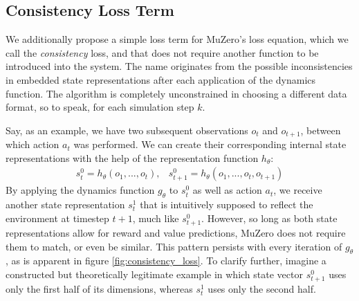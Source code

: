 \subsection{Consistency Loss Term}
We additionally propose a simple loss term for MuZero's loss equation, which we call the \textit{consistency} loss, and that does not require another function to be introduced into the system. The name originates from the possible inconsistencies in embedded state representations after each application of the dynamics function. The algorithm is completely unconstrained in choosing a different data format, so to speak, for each simulation step $k$.

Say, as an example, we have two subsequent observations $o_t$ and $o_{t+1}$, between which action $a_t$ was performed. We can create their corresponding internal state representations with the help of the representation function $h_\theta$:
\begin{equation*}
    \begin{array}{cc}
        s^0_t = h_\theta(o_1, ..., o_t), &
        s^0_{t+1} = h_\theta(o_1, ..., o_t, o_{t+1})
    \end{array}
\end{equation*}
By applying the dynamics function $g_\theta$ to $s_t^0$ as well as action $a_t$, we receive another state representation $s_t^1$ that is intuitively supposed to reflect the environment at timestep $t+1$, much like $s_{t+1}^0$. However, so long as both state representations allow for reward and value predictions, MuZero does not require them to match, or even be similar. This pattern persists with every iteration of $g_\theta$, as is apparent in figure \ref{fig:consistency_loss}. To clarify further, imagine a constructed but theoretically legitimate example in which state vector $s^0_{t+1}$ uses only the first half of its dimensions, whereas $s^1_t$ uses only the second half.
